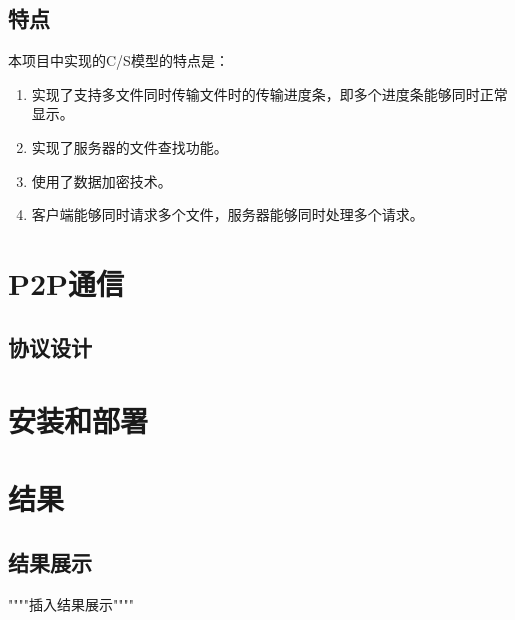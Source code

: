 \documentclass[15pt]{ctexart}
\begin{document}
\subsection{特点} %
\label{sub:特点}
本项目中实现的C/S模型的特点是：
\begin{enumerate}
	\item 实现了支持多文件同时传输文件时的传输进度条，即多个进度条能够同时正常显示。
	\item 实现了服务器的文件查找功能。
	\item 使用了数据加密技术。
	\item 客户端能够同时请求多个文件，服务器能够同时处理多个请求。
\end{enumerate}


\section{P2P通信} %
\label{sec:p2p通信}
\subsection{协议设计} %
\label{sub:协议设计}



\section{安装和部署} %
\label{sec:安装和部署}


\section{结果} %
\label{sec:结果}
\subsection{结果展示} %
\label{sub:结果展示}
\par """"插入结果展示""""
\\
\\
\\
\\
\\
\\
\\
\\
\\
\\
\\
\end{document}
